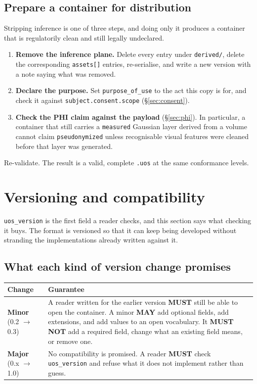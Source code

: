 \documentclass[11pt,a4paper]{article}
\newcommand{\MUST}{\textcolor{uosred}{\textbf{MUST}}}
\newcommand{\MUSTNOT}{\textcolor{uosred}{\textbf{MUST NOT}}}
\newcommand{\MAY}{\textcolor{uosgreen}{\textbf{MAY}}}
\newcommand{\code}[1]{\texttt{\small #1}}
\begin{document}
\subsection{Prepare a container for distribution}

Stripping inference is one of three steps, and doing only it produces a container that is
regulatorily clean and still legally undeclared.

\begin{enumerate}
  \item \textbf{Remove the inference plane.} Delete every entry under \code{derived/},
  delete the corresponding \code{assets[]} entries, re-serialise, and write a new version
  with a note saying what was removed.
  \item \textbf{Declare the purpose.} Set \code{purpose\_of\_use} to the act this copy is
  for, and check it against \code{subject.consent.scope} (\S\ref{sec:consent}).
  \item \textbf{Check the PHI claim against the payload} (\S\ref{sec:phi}). In particular,
  a container that still carries a \code{measured} Gaussian layer derived from a volume
  cannot claim \code{pseudonymized} unless recognisable visual features were cleaned before
  that layer was generated.
\end{enumerate}

Re-validate. The result is a valid, complete \code{.uos} at the same conformance levels.

\section{Versioning and compatibility}\label{sec:versioning}

\code{uos\_version} is the first field a reader checks, and this section says what checking
it buys. The format is versioned so that it can keep being developed without stranding the
implementations already written against it.

\subsection{What each kind of version change promises}

\begin{longtable}{L{3.0cm} L{12.2cm}}
\toprule
\textbf{Change} & \textbf{Guarantee}\\
\midrule
\endhead
\textbf{Minor} (0.2 $\to$ 0.3) & A reader written for the earlier version \MUST{} still be
able to open the container. A minor \MAY{} add optional fields, add extensions, and add
values to an open vocabulary. It \MUSTNOT{} add a required field, change what an existing
field means, or remove one.\\
\textbf{Major} (0.x $\to$ 1.0) & No compatibility is promised. A reader \MUST{} check
\code{uos\_version} and refuse what it does not implement rather than guess.\\
\bottomrule
\end{longtable}
\end{document}
